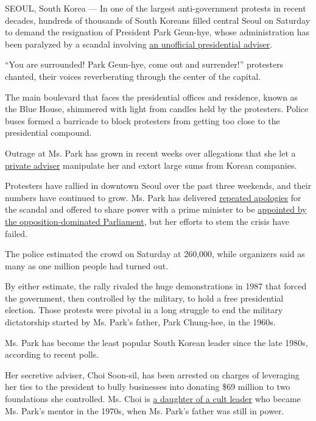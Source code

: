 SEOUL, South Korea --- In one of the largest anti-government protests in
recent decades, hundreds of thousands of South Koreans filled central
Seoul on Saturday to demand the resignation of President Park Geun-hye,
whose administration has been paralyzed by a scandal involving
\href{http://www.nytimes.com/2016/11/12/world/asia/south-korea-park-geun-hye.html}{an
unofficial presidential adviser}.

``You are surrounded! Park Geun-hye, come out and surrender!''
protesters chanted, their voices reverberating through the center of the
capital.

The main boulevard that faces the presidential offices and residence,
known as the Blue House, shimmered with light from candles held by the
protesters. Police buses formed a barricade to block protesters from
getting too close to the presidential compound.

Outrage at Ms. Park has grown in recent weeks over allegations that she
let a
\href{http://www.nytimes.com/2016/11/06/world/asia/south-koreans-ashamed-over-les-secretive-adviser.html}{private
adviser} manipulate her and extort large sums from Korean companies.

Protesters have rallied in downtown Seoul over the past three weekends,
and their numbers have continued to grow. Ms. Park has delivered
\href{http://www.nytimes.com/2016/11/04/world/asia/south-korea-park-geun-hye-investigation.html}{repeated
apologies} for the scandal and offered to share power with a prime
minister to be
\href{http://www.nytimes.com/2016/11/08/world/asia/south-korea-park-choi-scandal-parliament.html}{appointed
by the opposition-dominated Parliament}, but her efforts to stem the
crisis have failed.

The police estimated the crowd on Saturday at 260,000, while organizers
said as many as one million people had turned out.

By either estimate, the rally rivaled the huge demonstrations in 1987
that forced the government, then controlled by the military, to hold a
free presidential election. Those protests were pivotal in a long
struggle to end the military dictatorship started by Ms. Park's father,
Park Chung-hee, in the 1960s.

Ms. Park has become the least popular South Korean leader since the late
1980s, according to recent polls.

Her secretive adviser, Choi Soon-sil, has been arrested on charges of
leveraging her ties to the president to bully businesses into donating
\$69 million to two foundations she controlled. Ms. Choi is
\href{http://www.nytimes.com/2016/11/06/world/asia/south-koreans-ashamed-over-les-secretive-adviser.html}{a
daughter of a cult leader} who became Ms. Park's mentor in the 1970s,
when Ms. Park's father was still in power.

